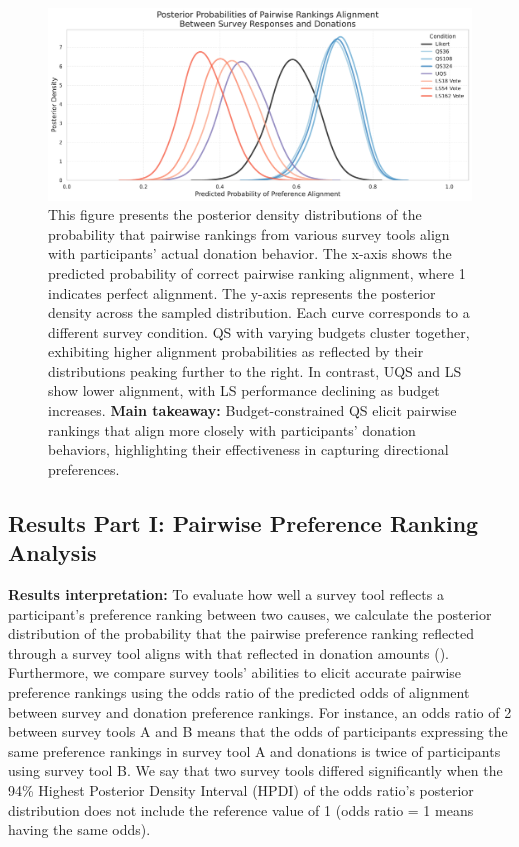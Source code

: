 \begin{figure}[h]
    \centering
    \includegraphics[width=\textwidth]{content/image/overlapping_density_custom_palette.pdf}
    \caption{
    This figure presents the posterior density distributions of the probability that pairwise rankings from various survey tools align with participants' actual donation behavior. The x-axis shows the predicted probability of correct pairwise ranking alignment, where 1 indicates perfect alignment. The y-axis represents the posterior density across the sampled distribution. Each curve corresponds to a different survey condition. QS with varying budgets cluster together, exhibiting higher alignment probabilities as reflected by their distributions peaking further to the right. In contrast, UQS and LS show lower alignment, with LS performance declining as budget increases. \textbf{Main takeaway:} Budget-constrained QS elicit pairwise rankings that align more closely with participants' donation behaviors, highlighting their effectiveness in capturing directional preferences.}
    \label{fig:ranking_posterior}
\end{figure}

\subsection{Results Part I: Pairwise Preference Ranking Analysis}
\label{sec:result_1}

\textbf{Results interpretation: }To evaluate how well a survey tool reflects a participant's preference ranking between two causes, we calculate the posterior distribution of the probability that the pairwise preference ranking reflected through a survey tool aligns with that reflected in donation amounts (). Furthermore, we compare survey tools' abilities to elicit accurate pairwise preference rankings using the odds ratio of the predicted odds of alignment between survey and donation preference rankings. For instance, an odds ratio of 2 between survey tools A and B means that the odds of participants expressing the same preference rankings in survey tool A and donations is twice of participants using survey tool B. We say that two survey tools differed significantly when the 94\% Highest Posterior Density Interval (HPDI) of the odds ratio's posterior distribution does not include the reference value of 1 (odds ratio = 1 means having the same odds). 

